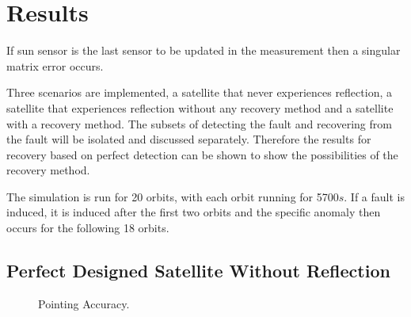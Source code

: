 \documentclass[letterpaper, 10 pt, conference]{ieeeconf}  %
\begin{document}
\section{Results}
If sun sensor is the last sensor to be updated in the measurement then a singular matrix error occurs.

Three scenarios are implemented, a satellite that never experiences reflection, a satellite that experiences reflection without any recovery method and a satellite with a recovery method. The subsets of detecting the fault and recovering from the fault will be isolated and discussed separately. Therefore the results for recovery based on perfect detection can be shown to show the possibilities of the recovery method.

The simulation is run for 20 orbits, with each orbit running for 5700$s$. If a fault is induced, it is induced after the first two orbits and the specific anomaly then occurs for the following 18 orbits.

\newpage

\subsection{Perfect Designed Satellite Without Reflection}
\begin{figure}[!htb]
	\centering
	\caption[Pointing Accuracy]{Pointing Accuracy.}
	\label{fig:Pointing Accuracy None}
\end{figure}
\end{document}
